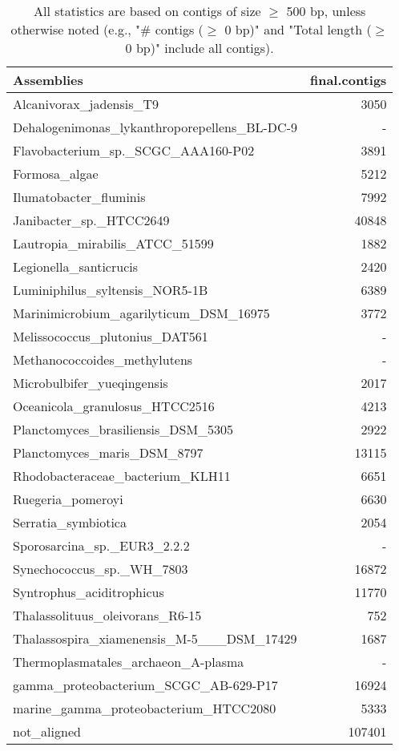 \documentclass[12pt,a4paper]{article}
\begin{document}
\begin{table}[ht]
\begin{center}
\caption{All statistics are based on contigs of size $\geq$ 500 bp, unless otherwise noted (e.g., "\# contigs ($\geq$ 0 bp)" and "Total length ($\geq$ 0 bp)" include all contigs).}
\begin{tabular}{|l*{1}{|r}|}
\hline
Assemblies & final.contigs \\ \hline
Alcanivorax\_jadensis\_T9 & 3050 \\ \hline
Dehalogenimonas\_lykanthroporepellens\_BL-DC-9 & - \\ \hline
Flavobacterium\_sp.\_SCGC\_AAA160-P02 & 3891 \\ \hline
Formosa\_algae & 5212 \\ \hline
Ilumatobacter\_fluminis & 7992 \\ \hline
Janibacter\_sp.\_HTCC2649 & 40848 \\ \hline
Lautropia\_mirabilis\_ATCC\_51599 & 1882 \\ \hline
Legionella\_santicrucis & 2420 \\ \hline
Luminiphilus\_syltensis\_NOR5-1B & 6389 \\ \hline
Marinimicrobium\_agarilyticum\_DSM\_16975 & 3772 \\ \hline
Melissococcus\_plutonius\_DAT561 & - \\ \hline
Methanococcoides\_methylutens & - \\ \hline
Microbulbifer\_yueqingensis & 2017 \\ \hline
Oceanicola\_granulosus\_HTCC2516 & 4213 \\ \hline
Planctomyces\_brasiliensis\_DSM\_5305 & 2922 \\ \hline
Planctomyces\_maris\_DSM\_8797 & 13115 \\ \hline
Rhodobacteraceae\_bacterium\_KLH11 & 6651 \\ \hline
Ruegeria\_pomeroyi & 6630 \\ \hline
Serratia\_symbiotica & 2054 \\ \hline
Sporosarcina\_sp.\_EUR3\_2.2.2 & - \\ \hline
Synechococcus\_sp.\_WH\_7803 & 16872 \\ \hline
Syntrophus\_aciditrophicus & 11770 \\ \hline
Thalassolituus\_oleivorans\_R6-15 & 752 \\ \hline
Thalassospira\_xiamenensis\_M-5\_\_\_DSM\_17429 & 1687 \\ \hline
Thermoplasmatales\_archaeon\_A-plasma & - \\ \hline
gamma\_proteobacterium\_SCGC\_AB-629-P17 & 16924 \\ \hline
marine\_gamma\_proteobacterium\_HTCC2080 & 5333 \\ \hline
not\_aligned & 107401 \\ \hline
\end{tabular}
\end{center}
\end{table}
\end{document}
